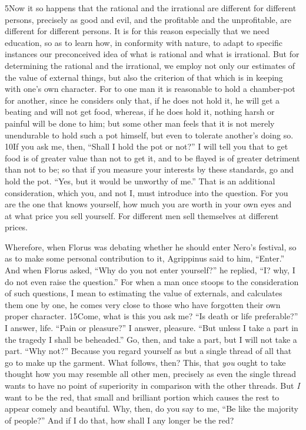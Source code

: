 5Now it so happens that the rational and the irrational are different for different persons, precisely as good and evil, and the profitable and the unprofitable, are different for different persons. It is for this reason especially that we need education, so as to learn how, in conformity with nature, to adapt to specific instances our preconceived idea of what is rational and what is irrational. But for determining the rational and the irrational, we employ not only our estimates of the value of external things, but also the criterion of that which is in keeping with one's own character. For to one man it is reasonable to hold a chamber-pot for another, since he considers only that, if he does not hold it, he will get a beating and will not get food, whereas, if he does hold it, nothing harsh or painful will be done to him; but some other man feels that it is not merely unendurable to hold such a pot himself, but even to tolerate another's doing so. 10If you ask me, then, ``Shall I hold the pot or not?'' I will tell you that to get food is of greater value than not to get it, and to be flayed is of greater detriment than not to be; so that if you measure your interests by these standards, go and hold the pot. ``Yes, but it would be unworthy of me.'' That is an additional consideration, which you, and not I, must introduce into the question. For you are the one that knows yourself, how much you are worth in your own eyes and at what price you sell yourself. For different men sell themselves at different prices.

Wherefore, when Florus was debating whether he should enter Nero's festival, so as to make some personal contribution to it, Agrippinus said to him, ``Enter.'' And when Florus asked, ``Why do you not enter yourself?'' he replied, ``I? why, I do not even raise the question.'' For when a man once stoops to the consideration of such questions, I mean to estimating the value of externals, and calculates them one by one, he comes very close to those who have forgotten their own proper character. 15Come, what is this you ask me? ``Is death or life preferable?'' I answer, life. ``Pain or pleasure?'' I answer, pleasure. ``But unless I take a part in the tragedy I shall be beheaded.'' Go, then, and take a part, but I will not take a part. ``Why not?'' Because you regard yourself as but a single thread of all that go to make up the garment. What follows, then? This, that \emph{you} ought to take thought how you may resemble all other men, precisely as even the single thread wants to have no point of superiority in comparison with the other threads. But \emph{I} want to be the red, that small and brilliant portion which causes the rest to appear comely and beautiful. Why, then, do you say to me, ``Be like the majority of people?'' And if I do that, how shall I any longer be the red?

